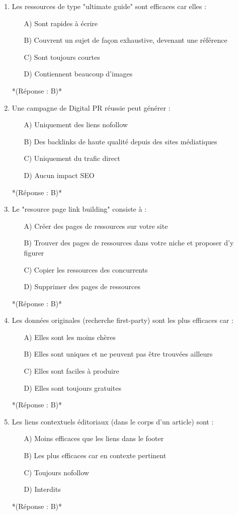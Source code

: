 \documentclass[12pt,a4paper,twoside]{report}
\begin{document}
\begin{enumerate}
\item Les ressources de type "ultimate guide" sont efficaces car elles :
\begin{itemize}
\item[A)] Sont rapides à écrire
\item[B)] Couvrent un sujet de façon exhaustive, devenant une référence
\item[C)] Sont toujours courtes
\item[D)] Contiennent beaucoup d'images
\end{itemize}
*(Réponse : B)*

\item Une campagne de Digital PR réussie peut générer :
\begin{itemize}
\item[A)] Uniquement des liens nofollow
\item[B)] Des backlinks de haute qualité depuis des sites médiatiques
\item[C)] Uniquement du trafic direct
\item[D)] Aucun impact SEO
\end{itemize}
*(Réponse : B)*

\item Le "resource page link building" consiste à :
\begin{itemize}
\item[A)] Créer des pages de ressources sur votre site
\item[B)] Trouver des pages de ressources dans votre niche et proposer d'y figurer
\item[C)] Copier les ressources des concurrents
\item[D)] Supprimer des pages de ressources
\end{itemize}
*(Réponse : B)*

\item Les données originales (recherche first-party) sont les plus efficaces car :
\begin{itemize}
\item[A)] Elles sont les moins chères
\item[B)] Elles sont uniques et ne peuvent pas être trouvées ailleurs
\item[C)] Elles sont faciles à produire
\item[D)] Elles sont toujours gratuites
\end{itemize}
*(Réponse : B)*

\item Les liens contextuels éditoriaux (dans le corps d'un article) sont :
\begin{itemize}
\item[A)] Moins efficaces que les liens dans le footer
\item[B)] Les plus efficaces car en contexte pertinent
\item[C)] Toujours nofollow
\item[D)] Interdits
\end{itemize}
*(Réponse : B)*


\end{enumerate}
\end{document}
